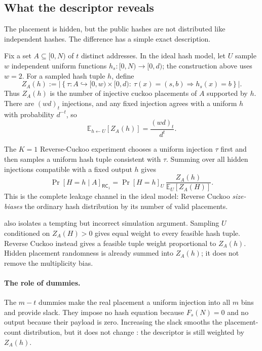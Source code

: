 \subsection{What the descriptor reveals}
\label{sec:revCuckooDistribution}

The placement is hidden, but the public hashes are not distributed like
independent hashes.  The difference has a simple exact description.

Fix a set $A\subseteq[0,N)$ of $t$ distinct addresses.  In the ideal hash
model, let $U$ sample $w$ independent uniform functions
$h_s:[0,N)\rightarrow[0,d)$; the construction above uses $w=2$.  For a sampled
hash tuple $h$, define
\begin{equation}\label{eq:rc-placement-count}
 Z_A(h):=
 \left|\left\{
  \tau:A\hookrightarrow[0,w)\times[0,d) :\
  \tau(x)=(s,b)\Longrightarrow h_s(x)=b
 \right\}\right|.
\end{equation}
Thus $Z_A(h)$ is the number of injective cuckoo placements of $A$ supported by
$h$.  There are $(wd)_t$ injections, and any fixed injection agrees with a
uniform $h$ with probability $d^{-t}$, so
\begin{equation}\label{eq:rc-expected-placements}
 \mathbb E_{h\gets U}[Z_A(h)]=\frac{(wd)_t}{d^t}.
\end{equation}

The $K=1$ Reverse-Cuckoo experiment chooses a uniform injection $\tau$ first
and then samples a uniform hash tuple consistent with $\tau$.  Summing over
all hidden injections compatible with a fixed output $h$ gives
\begin{equation}\label{eq:rc-size-bias-clean}
 \Pr[H=h\mid A]_{\mathsf{RC}_1}
 =\Pr[H=h]_U\,
   \frac{Z_A(h)}{\mathbb E_U[Z_A(H)]}.
\end{equation}
This is the complete leakage channel in the ideal model: Reverse Cuckoo
\emph{size-biases} the ordinary hash distribution by its number of valid
placements.

 also isolates a tempting but incorrect
simulation argument.  Sampling $U$ conditioned on $Z_A(H)>0$ gives equal
weight to every feasible hash tuple.  Reverse Cuckoo instead gives a feasible
tuple weight proportional to $Z_A(h)$.  Hidden placement randomness is already
summed into $Z_A(h)$; it does not remove the multiplicity bias.

\paragraph{The role of dummies.}
The $m-t$ dummies make the real placement a uniform injection into all $m$
bins and provide slack.  They impose no hash equation because $F_s(N)=0$ and
no output because their payload is zero.  Increasing the slack smooths the
placement-count distribution, but it does not change
: the descriptor is still weighted by
$Z_A(h)$.

